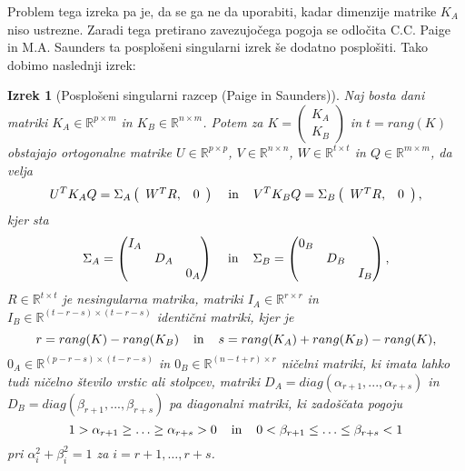 \documentclass[mat1]{article}
\newtheorem{izrek}{Izrek}
\begin{document}
Problem tega izreka pa je, da se ga ne da uporabiti, kadar dimenzije matrike $K_A$ niso ustrezne. Zaradi tega pretirano zavezujočega pogoja se odločita C.C. Paige in M.A. Saunders ta posplošeni singularni izrek še dodatno posplošiti. Tako dobimo naslednji izrek:
\begin{izrek}[Posplošeni singularni razcep (Paige in Saunders)]
\label{izrek:GSVD} Naj bosta dani matriki $K_A \in \mathbb{R}^{p \times m}$ in $K_B \in \mathbb{R}^{n \times m}$. Potem za $K = \left(\begin{array}{c} K_A \\ K_B \end{array}\right)$ in $t = rang(K)$ obstajajo ortogonalne matrike $U \in \mathbb{R}^{p \times p}$, $V \in \mathbb{R}^{n \times n}$, $W \in \mathbb{R}^{t \times t}$ in $Q \in \mathbb{R}^{m \times m}$, da velja 
$$U^T K_A Q = \Sigma_A  \left(\begin{array}{cc} W^T R, & 0 \end{array}\right) \hspace{4mm} \text{in} \hspace{4mm} V^T K_B Q = \Sigma_B  \left(\begin{array}{cc} W^T R, & 0 \end{array}\right) \text{,}$$ kjer sta
$$\Sigma_A = \begin{pmatrix} 
I_A &  & \\
 & D_A & \\
 & & 0_A  
\end{pmatrix} \hspace{4mm} \text{in} \hspace{4mm}
\Sigma_B = \begin{pmatrix} 
0_B &  & \\
 & D_B & \\
 & & I_B  
\end{pmatrix} \text{,}$$ 
$R \in \mathbb{R}^{t \times t}$ je nesingularna matrika, matriki $I_A \in \mathbb{R}^{r \times r}$ in $I_B \in \mathbb{R}^{(t-r-s) \times (t-r-s)}$ identični matriki, kjer je 
$$r = rang(K) - rang(K_B) \hspace{4mm} \text{in} \hspace{4mm} s = rang(K_A) + rang(K_B) - rang(K),$$
$0_A \in \mathbb{R}^{(p-r-s) \times (t-r-s)}$ in $0_B \in \mathbb{R}^{(n-t+r) \times r}$ ničelni matriki, ki imata lahko tudi ničelno število vrstic ali stolpcev, matriki
$D_A = diag(\alpha_{r+1},..., \alpha_{r+s})$ in $D_B = diag(\beta_{r+1},..., \beta_{r+s})$ pa diagonalni matriki, ki zadoščata pogoju
$$1 > \alpha_{r+1} \geq \ldots \geq \alpha_{r+s} > 0 \hspace{4mm} \text{in} \hspace{4mm} 0 < \beta_{r+1} \leq \ldots \leq \beta_{r+s} < 1$$
pri $\alpha_i^2 + \beta_i^2 = 1$ za $ i = r+1,\ldots, r+s$.
\end{izrek}
\end{document}
